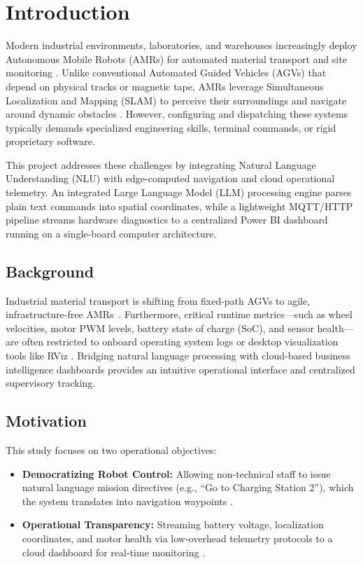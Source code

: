 \chapter{Introduction}
\label{chap:introduction}

Modern industrial environments, laboratories, and warehouses increasingly deploy Autonomous Mobile Robots (AMRs) for automated material transport and site monitoring \cite{macenski2021slam}. Unlike conventional Automated Guided Vehicles (AGVs) that depend on physical tracks or magnetic tape, AMRs leverage Simultaneous Localization and Mapping (SLAM) to perceive their surroundings and navigate around dynamic obstacles \cite{thrun2005probabilistic}. However, configuring and dispatching these systems typically demands specialized engineering skills, terminal commands, or rigid proprietary software.

This project addresses these challenges by integrating Natural Language Understanding (NLU) with edge-computed navigation and cloud operational telemetry. An integrated Large Language Model (LLM) processing engine parses plain text commands into spatial coordinates, while a lightweight MQTT/HTTP pipeline streams hardware diagnostics to a centralized Power BI dashboard running on a single-board computer architecture.

\section{Background}
Industrial material transport is shifting from fixed-path AGVs to agile, infrastructure-free AMRs~\citep{siegwart2011introduction}.
Furthermore, critical runtime metrics—such as wheel velocities, motor PWM levels, battery state of charge (SoC), and sensor health—are often restricted to onboard operating system logs or desktop visualization tools like RViz \cite{openrobotics2024nav2}. Bridging natural language processing with cloud-based business intelligence dashboards provides an intuitive operational interface and centralized supervisory tracking.

\section{Motivation}
This study focuses on two operational objectives:
\begin{itemize}
    \item \textbf{Democratizing Robot Control:} Allowing non-technical staff to issue natural language mission directives (e.g., ``Go to Charging Station 2''), which the system translates into navigation waypoints \cite{brown2020language, openai2024gpt}.
    \item \textbf{Operational Transparency:} Streaming battery voltage, localization coordinates, and motor health via low-overhead telemetry protocols to a cloud dashboard for real-time monitoring \cite{oasis2019mqtt, microsoft2024powerbi}.
\end{itemize}

